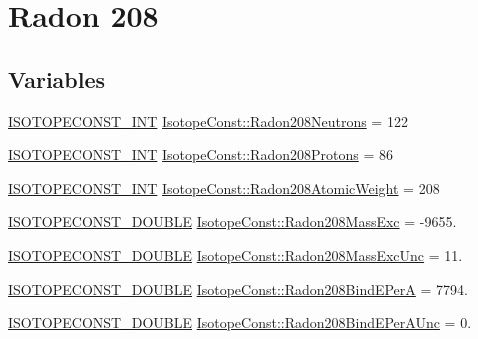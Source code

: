 \hypertarget{group___isotope_const-_radon-_rn208}{}\section{Radon 208}
\label{group___isotope_const-_radon-_rn208}
\subsection*{Variables}
\begin{DoxyCompactItemize}
\item 
\mbox{\hyperlink{group___isotope_const-_macros_ga5f18360b3e99483a35c32d789e62621c}{I\+S\+O\+T\+O\+P\+E\+C\+O\+N\+S\+T\+\_\+\+I\+NT}} \mbox{\hyperlink{group___isotope_const-_radon-_rn208_ga1beb8de729930000d7cee94d12ff6606}{Isotope\+Const\+::\+Radon208\+Neutrons}} = 122
\item 
\mbox{\hyperlink{group___isotope_const-_macros_ga5f18360b3e99483a35c32d789e62621c}{I\+S\+O\+T\+O\+P\+E\+C\+O\+N\+S\+T\+\_\+\+I\+NT}} \mbox{\hyperlink{group___isotope_const-_radon-_rn208_gad416d10c27da69f4113194531696e911}{Isotope\+Const\+::\+Radon208\+Protons}} = 86
\item 
\mbox{\hyperlink{group___isotope_const-_macros_ga5f18360b3e99483a35c32d789e62621c}{I\+S\+O\+T\+O\+P\+E\+C\+O\+N\+S\+T\+\_\+\+I\+NT}} \mbox{\hyperlink{group___isotope_const-_radon-_rn208_ga64cdb85b1077cda88fa3c2da2f26d624}{Isotope\+Const\+::\+Radon208\+Atomic\+Weight}} = 208
\item 
\mbox{\hyperlink{group___isotope_const-_macros_ga8f45a7272ce02c0b4c65c44636ed719a}{I\+S\+O\+T\+O\+P\+E\+C\+O\+N\+S\+T\+\_\+\+D\+O\+U\+B\+LE}} \mbox{\hyperlink{group___isotope_const-_radon-_rn208_ga7fc07bbd12522d786e0d1f5152efed9d}{Isotope\+Const\+::\+Radon208\+Mass\+Exc}} = -\/9655.
\item 
\mbox{\hyperlink{group___isotope_const-_macros_ga8f45a7272ce02c0b4c65c44636ed719a}{I\+S\+O\+T\+O\+P\+E\+C\+O\+N\+S\+T\+\_\+\+D\+O\+U\+B\+LE}} \mbox{\hyperlink{group___isotope_const-_radon-_rn208_gab82d425cad5b6e71d7320a7381f5f30f}{Isotope\+Const\+::\+Radon208\+Mass\+Exc\+Unc}} = 11.
\item 
\mbox{\hyperlink{group___isotope_const-_macros_ga8f45a7272ce02c0b4c65c44636ed719a}{I\+S\+O\+T\+O\+P\+E\+C\+O\+N\+S\+T\+\_\+\+D\+O\+U\+B\+LE}} \mbox{\hyperlink{group___isotope_const-_radon-_rn208_ga340023e321760b999f1043ced57821b7}{Isotope\+Const\+::\+Radon208\+Bind\+E\+PerA}} = 7794.
\item 
\mbox{\hyperlink{group___isotope_const-_macros_ga8f45a7272ce02c0b4c65c44636ed719a}{I\+S\+O\+T\+O\+P\+E\+C\+O\+N\+S\+T\+\_\+\+D\+O\+U\+B\+LE}} \mbox{\hyperlink{group___isotope_const-_radon-_rn208_ga5f1c64e409a8f5927fa688de1e93c2a3}{Isotope\+Const\+::\+Radon208\+Bind\+E\+Per\+A\+Unc}} = 0.

\end{DoxyCompactItemize}
